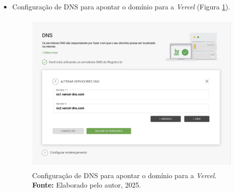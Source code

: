 \begin{itemize}
    \item Configuração de DNS para apontar o domínio para a \textit{Vercel} (Figura \ref{fig:dns}).
\begin{figure}[H]
    \centering
    \includegraphics[height=8cm, keepaspectratio]{img/Deploy/configuração de dns registrobr.png}
    \caption{ Configuração de DNS para apontar o domínio para a \textit{Vercel}. \\
        \textbf{Fonte:} Elaborado pelo autor, 2025.}
    \label{fig:dns}
\end{figure}

\end{itemize}



